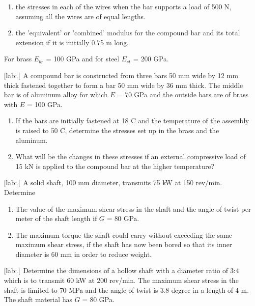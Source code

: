 \documentclass[a4paper,openany,12pt]{book}
\begin{document}
\begin{enumerate}
\item the stresses in each of the wires when the bar supports a load of 500
N, assuming all the wires are of equal lengths.

\item the 'equivalent' or 'combined' modulus for the compound bar and its
total extension if it is initially 0.75 m long.
\end{enumerate}

For brass \(E_{br}\) = 100 GPa and for steel \(E_{st}\) = 200 GPa.

[lab:.] A compound bar is constructed
from three bars 50 mm wide by 12 mm thick fastened together to form a
bar 50 mm wide by 36 mm thick. The middle bar is of aluminum alloy for
which \(E\) = 70 GPa and the outside bars are of brass with \(E\) = 100 GPa.



\begin{enumerate}
\item If the bars are initially fastened at 18 C and the temperature of the
assembly is raised to 50 C, determine the stresses set up in the
brass and the aluminum.

\item What will be the changes in these stresses if an external compressive
load of 15 kN is applied to the compound bar at the higher
temperature?
\end{enumerate}

[lab:.] A solid shaft, 100 mm
diameter, transmits 75 kW at 150 rev/min. Determine



\begin{enumerate}
\item The value of the maximum shear stress in the shaft and the angle of
twist per meter of the shaft length if \(G\) = 80 GPa.

\item The maximum torque the shaft could carry without exceeding the same
maximum shear stress, if the shaft has now been bored so that its
inner diameter is 60 mm in order to reduce weight.
\end{enumerate}

[lab:.] Determine the dimensions of a
hollow shaft with a diameter ratio of 3:4 which is to transmit 60 kW at
200 rev/min. The maximum shear stress in the shaft is limited to 70 MPa
and the angle of twist is 3.8 degree in a length of 4 m. The shaft
material has \(G\) = 80 GPa.
\end{document}
